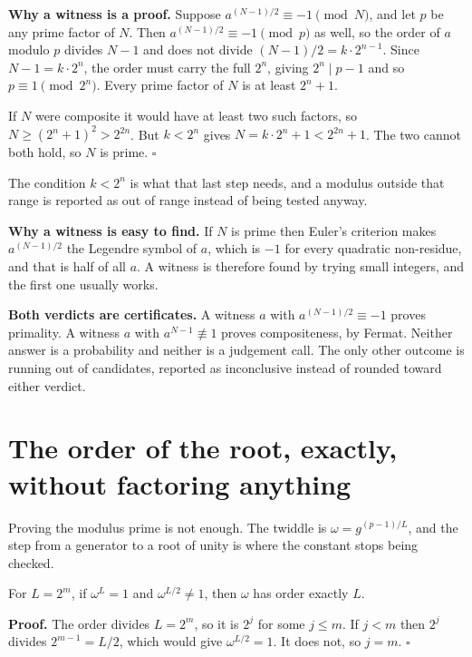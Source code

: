 \textbf{Why a witness is a proof.} Suppose \(a^{(N-1)/2} \equiv -1 \pmod N\), and let \(p\) be any prime factor of \(N\). Then \(a^{(N-1)/2} \equiv -1 \pmod p\) as well, so the order of \(a\) modulo \(p\) divides \(N-1\) and does not divide \((N-1)/2 = k \cdot 2^{n-1}\). Since \(N - 1 = k \cdot 2^n\), the order must carry the full \(2^n\), giving \(2^n \mid p-1\) and so \(p \equiv 1 \pmod{2^n}\). Every prime factor of \(N\) is at least \(2^n + 1\).

If \(N\) were composite it would have at least two such factors, so \(N \ge (2^n+1)^2 > 2^{2n}\). But \(k < 2^n\) gives \(N = k \cdot 2^n + 1 < 2^{2n} + 1\). The two cannot both hold, so \(N\) is prime. \(\square\)

The condition \(k < 2^n\) is what that last step needs, and a modulus outside that range is reported as out of range instead of being tested anyway.

\textbf{Why a witness is easy to find.} If \(N\) is prime then Euler's criterion makes \(a^{(N-1)/2}\) the Legendre symbol of \(a\), which is \(-1\) for every quadratic non-residue, and that is half of all \(a\). A witness is therefore found by trying small integers, and the first one usually works.

\textbf{Both verdicts are certificates.} A witness \(a\) with \(a^{(N-1)/2} \equiv -1\) proves primality. A witness \(a\) with \(a^{N-1} \not\equiv 1\) proves compositeness, by Fermat. Neither answer is a probability and neither is a judgement call. The only other outcome is running out of candidates, reported as inconclusive instead of rounded toward either verdict.

\section{The order of the root, exactly, without factoring anything}

Proving the modulus prime is not enough. The twiddle is \(\omega = g^{(p-1)/L}\), and the step from a generator to a root of unity is where the constant stops being checked.

\begin{proposition}
For \(L = 2^m\), if \(\omega^L = 1\) and \(\omega^{L/2} \ne 1\), then \(\omega\) has order exactly \(L\).
\end{proposition}

\textbf{Proof.} The order divides \(L = 2^m\), so it is \(2^j\) for some \(j \le m\). If \(j < m\) then \(2^j\) divides \(2^{m-1} = L/2\), which would give \(\omega^{L/2} = 1\). It does not, so \(j = m\). \(\square\)

